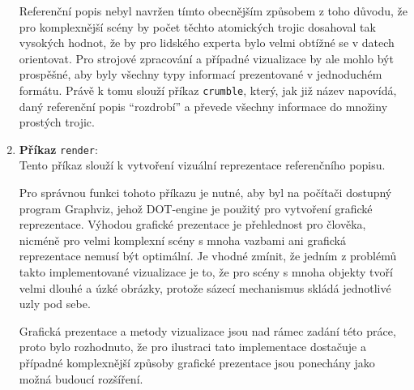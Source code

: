 \begin{enumerate}
	      Referenční popis nebyl navržen tímto obecnějším způsobem z toho důvodu, že pro komplexnější scény by počet těchto atomických trojic dosahoval tak vysokých hodnot,
	      že by pro lidského experta bylo velmi obtížné se v datech orientovat.
	      Pro strojové zpracování a případné vizualizace by ale mohlo být prospěšné, aby byly všechny typy informací prezentované v jednoduchém formátu.
	      Právě k tomu slouží příkaz \texttt{crumble}, který, jak již název napovídá, daný referenční popis \enquote{rozdrobí} a převede všechny informace do množiny prostých trojic.
	\item \textbf{Příkaz} \texttt{render}: \\
	      Tento příkaz slouží k vytvoření vizuální reprezentace referenčního popisu.

	      Pro správnou funkci tohoto příkazu je nutné, aby byl na počítači dostupný program Graphviz,
	      jehož DOT-engine je použitý pro vytvoření grafické reprezentace.
	      Výhodou grafické prezentace je přehlednost pro člověka, nicméně pro velmi komplexní scény s mnoha vazbami ani grafická reprezentace nemusí být optimální.
	      Je vhodné zmínit, že jedním z problémů takto implementované vizualizace je to, že pro scény s mnoha objekty tvoří velmi dlouhé a úzké obrázky,
	      protože sázecí mechanismus skládá jednotlivé uzly pod sebe.

	      Grafická prezentace a metody vizualizace jsou nad rámec zadání této práce, proto bylo rozhodnuto, že pro ilustraci tato implementace dostačuje a případné komplexnější
	      způsoby grafické prezentace jsou ponechány jako možná budoucí rozšíření.
\end{enumerate}
